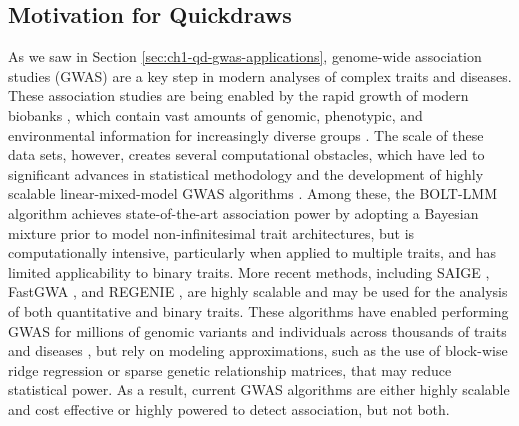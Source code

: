 \subsection{Motivation for Quickdraws}
As we saw in Section \ref{sec:ch1-qd-gwas-applications}, genome-wide association studies (GWAS) are a key step in modern analyses of complex traits and diseases.
%
These association studies are being enabled by the rapid growth of modern biobanks \cite{bycroft2018uk,nagai2017overview,ramirez2022all,wojcik2019genetic,chen2011china,kurki2023finngen}, which contain vast amounts of genomic, phenotypic, and environmental information for increasingly diverse groups \cite{zhou2022global}.
%
The scale of these data sets, however, creates several computational obstacles, which have led to significant advances in statistical methodology and the development of highly scalable linear-mixed-model GWAS algorithms \cite{yu2006unified,kang2008efficient,kang2010variance,zhang2010mixed,zhou2012genome,lippert2011fast,segura2012efficient,listgarten2012improved,listgarten2013fast,loh2015efficient,loh2018mixed,jiang2019resource}.
%
Among these, the BOLT-LMM algorithm \cite{loh2015efficient,loh2018mixed} achieves state-of-the-art association power by adopting a Bayesian mixture prior to model non-infinitesimal trait architectures, but is computationally intensive, particularly when applied to multiple traits, and has limited applicability to binary traits.
%
More recent methods, including SAIGE \cite{zhou2018efficiently}, FastGWA \cite{jiang2019resource,jiang2021generalized}, and REGENIE \cite{mbatchou2021computationally}, are highly scalable and may be used for the analysis of both quantitative and binary traits.
%
These algorithms have enabled performing GWAS for millions of genomic variants and individuals \cite{yengo2022saturated} across thousands of traits and diseases \cite{wang2021rare}, but rely on modeling approximations, such as the use of block-wise ridge regression
 or sparse genetic relationship matrices, that may reduce statistical power.
%
As a result, current GWAS algorithms are either highly scalable and cost effective or highly powered to detect association, but not both.

